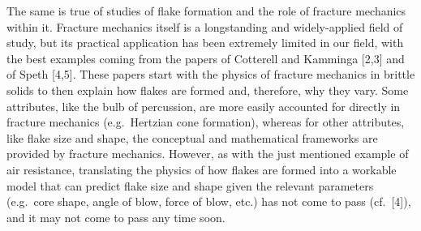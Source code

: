 \documentclass[10pt,letterpaper]{article}
\begin{document}
The same is true of studies of flake formation and the role of fracture
mechanics within it. Fracture mechanics itself is a longstanding and
widely-applied field of study, but its practical application has been
extremely limited in our field, with the best examples coming from the
papers of Cotterell and Kamminga {[}2,3{]} and of Speth {[}4,5{]}. These
papers start with the physics of fracture mechanics in brittle solids to
then explain how flakes are formed and, therefore, why they vary. Some
attributes, like the bulb of percussion, are more easily accounted for
directly in fracture mechanics (e.g.~Hertzian cone formation), whereas
for other attributes, like flake size and shape, the conceptual and
mathematical frameworks are provided by fracture mechanics. However, as
with the just mentioned example of air resistance, translating the
physics of how flakes are formed into a workable model that can predict
flake size and shape given the relevant parameters (e.g.~core shape,
angle of blow, force of blow, etc.) has not come to pass (cf.~{[}4{]}),
and it may not come to pass any time soon.
\end{document}
